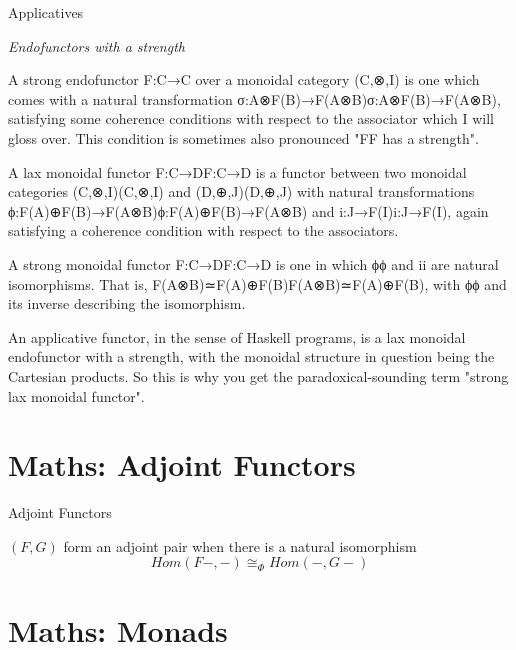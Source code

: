 \documentclass[10pt]{beamer}
\newcommand{\Cat}[1]{\ensuremath{\underline{\mathbf{#1}}}}
\theoremstyle{definition}
\theoremstyle{remark}
\numberwithin{equation}{section}
\begin{document}
\begin{frame}[fragile]{Applicatives}

  \emph{Endofunctors with a strength}

  A strong endofunctor F:C→C over a monoidal category (C,⊗,I) is one which comes with a natural transformation σ:A⊗F(B)→F(A⊗B)σ:A⊗F(B)→F(A⊗B), satisfying some coherence conditions with respect to the associator which I will gloss over. This condition is sometimes also pronounced "FF has a strength".

  A lax monoidal functor F:C→DF:C→D is a functor between two monoidal categories (C,⊗,I)(C,⊗,I) and (D,⊕,J)(D,⊕,J) with natural transformations ϕ:F(A)⊕F(B)→F(A⊗B)ϕ:F(A)⊕F(B)→F(A⊗B) and i:J→F(I)i:J→F(I), again satisfying a coherence condition with respect to the associators.

  A strong monoidal functor F:C→DF:C→D is one in which ϕϕ and ii are natural isomorphisms. That is, F(A⊗B)≃F(A)⊕F(B)F(A⊗B)≃F(A)⊕F(B), with ϕϕ and its inverse describing the isomorphism.

  An applicative functor, in the sense of Haskell programs, is a lax monoidal endofunctor with a strength, with the monoidal structure in question being the Cartesian products. So this is why you get the paradoxical-sounding term "strong lax monoidal functor".
\end{frame}

\section{Maths: Adjoint Functors}

\begin{frame}[fragile]{Adjoint Functors}

$(F,G)$ form an adjoint pair when there is a natural isomorphism
  \[
  Hom(F-,-) \cong_{\Phi} Hom(-,G-)
  \]
  
\end{frame}


\section{Maths: Monads}
\end{document}
